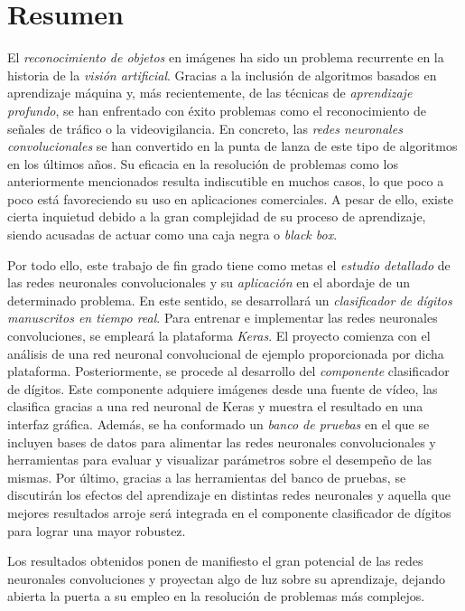 \chapter*{Resumen}
El \emph{reconocimiento de objetos} en imágenes ha sido un problema recurrente en la historia de la \emph{visión artificial}. Gracias a la inclusión de algoritmos basados en aprendizaje máquina y, más recientemente, de las técnicas de \emph{aprendizaje profundo}, se han enfrentado con éxito problemas como el reconocimiento de señales de tráfico o la videovigilancia. En concreto, las \emph{redes neuronales convolucionales} se han convertido en la punta de lanza de este tipo de algoritmos en los últimos años. Su eficacia en la resolución de problemas como los anteriormente mencionados resulta indiscutible en muchos casos, lo que poco a poco está favoreciendo su uso en aplicaciones comerciales. A pesar de ello, existe cierta inquietud debido a la gran complejidad de su proceso de aprendizaje, siendo acusadas de actuar como una caja negra o \emph{black box}.

Por todo ello, este trabajo de fin grado tiene como metas el \emph{estudio detallado} de las redes neuronales convolucionales y su \emph{aplicación} en el abordaje de un determinado problema. En este sentido, se desarrollará un \emph{clasificador de dígitos manuscritos en tiempo real}. Para entrenar e implementar las redes neuronales convoluciones, se empleará la plataforma \emph{Keras}. El proyecto comienza con el análisis de una red neuronal convolucional de ejemplo proporcionada por dicha plataforma. Posteriormente, se procede al desarrollo del \emph{componente} clasificador de dígitos. Este componente adquiere imágenes desde una fuente de vídeo, las clasifica gracias a una red neuronal de Keras y muestra el resultado en una interfaz gráfica. Además, se ha conformado un \emph{banco de pruebas} en el que se incluyen bases de datos para alimentar las redes neuronales convolucionales y herramientas para evaluar y visualizar parámetros sobre el desempeño de las mismas. Por último, gracias a las herramientas del banco de pruebas, se discutirán los efectos del aprendizaje en distintas redes neuronales y aquella que mejores resultados arroje será integrada en el componente clasificador de dígitos para lograr una mayor robustez.

Los resultados obtenidos ponen de manifiesto el gran potencial de las redes neuronales convoluciones y proyectan algo de luz sobre su aprendizaje, dejando abierta la puerta a su empleo en la resolución de problemas más complejos.